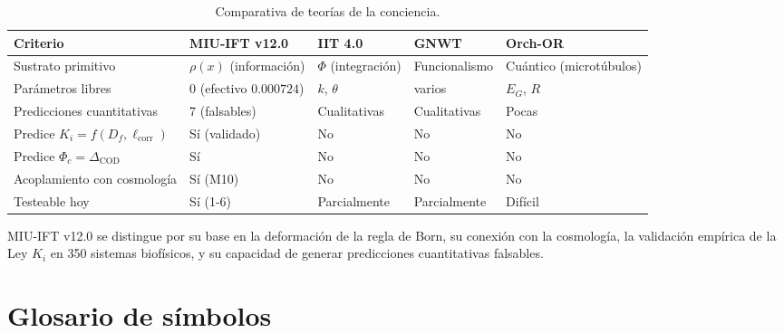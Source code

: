 \documentclass[12pt, a4paper]{article}
\theoremstyle{miuThm}
\theoremstyle{remark}
\newcommand{\eps}{0.000724}
\begin{document}
\begin{table}[h!]
\centering
\caption{Comparativa de teorías de la conciencia.}
\label{tab:teorias}
\begin{tabular}{p{2.5cm}p{3cm}p{3cm}p{3cm}p{2.5cm}}
\toprule
\textbf{Criterio} & \textbf{MIU-IFT v12.0} & \textbf{IIT 4.0} & \textbf{GNWT} & \textbf{Orch-OR} \\
\midrule
Sustrato primitivo & $\rho(x)$ (información) & $\Phi$ (integración) & Funcionalismo & Cuántico (microtúbulos) \\
Parámetros libres & 0 (efectivo $\eps$) & $k$, $\theta$ & varios & $E_G$, $R$ \\
Predicciones cuantitativas & 7 (falsables) & Cualitativas & Cualitativas & Pocas \\
Predice $K_i = f(D_f,\ell_{\text{corr}})$ & Sí (validado) & No & No & No \\
Predice $\Phi_c = \Delta_{\text{COD}}$ & Sí & No & No & No \\
Acoplamiento con cosmología & Sí (M10) & No & No & No \\
Testeable hoy & Sí (1-6) & Parcialmente & Parcialmente & Difícil \\
\bottomrule
\end{tabular}
\end{table}

MIU-IFT v12.0 se distingue por su base en la deformación de la regla de Born, su conexión con la cosmología, la validación empírica de la Ley $K_i$ en 350 sistemas biofísicos, y su capacidad de generar predicciones cuantitativas falsables.

\clearpage
\section{Glosario de símbolos}
\end{document}
